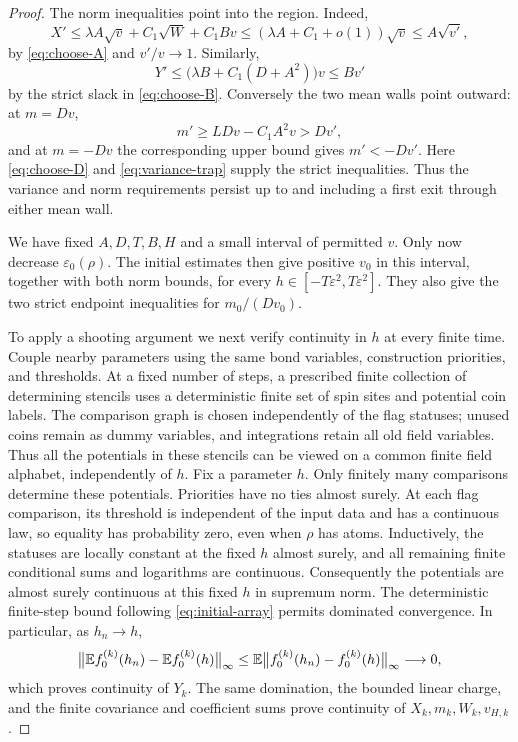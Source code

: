 \begin{proof}
The norm inequalities point into the region.  Indeed,
\[
 X'\le\lambda A\sqrt v+C_1\sqrt W+C_1Bv
     \le(\lambda A+C_1+o(1))\sqrt v
     \le A\sqrt{v'},
\]
by \eqref{eq:choose-A} and \(v'/v\to1\).  Similarly,
\[
 Y'\le\bigl(\lambda B+C_1(D+A^2)\bigr)v\le Bv'
\]
by the strict slack in \eqref{eq:choose-B}.  Conversely the two mean
walls point outward: at \(m=Dv\),
\[
 m'\ge LDv-C_1A^2v>Dv',
\]
and at \(m=-Dv\) the corresponding upper bound gives \(m'<-Dv'\).
Here \eqref{eq:choose-D} and \eqref{eq:variance-trap} supply the strict
inequalities.  Thus the variance and norm requirements persist up to
and including a first exit through either mean wall.

We have fixed \(A,D,T,B,H\) and a small interval of permitted \(v\).
Only now decrease \(\varepsilon_0(\rho)\).  The initial estimates then
give positive \(v_0\) in this interval, together with both norm bounds,
for every \(h\in[-T\varepsilon^2,T\varepsilon^2]\).  They also give
the two strict endpoint inequalities for \(m_0/(Dv_0)\).

To apply a shooting argument we next verify continuity in \(h\) at
every finite time.  Couple nearby parameters using the same bond
variables, construction priorities, and thresholds.  At a fixed number
of steps, a prescribed finite collection of determining stencils uses
a deterministic finite set of spin sites and potential coin labels.
The comparison graph is chosen independently of the flag statuses;
unused coins remain as dummy variables, and integrations retain all old
field variables.  Thus all the potentials in these stencils can be
viewed on a common finite field alphabet, independently of \(h\).
Fix a parameter \(h\).  Only finitely many comparisons determine these
potentials.
Priorities have no ties almost surely.  At each flag comparison, its
threshold is independent of the input data and has a continuous law,
so equality has probability zero, even when \(\rho\) has atoms.
Inductively, the statuses are locally constant at the fixed \(h\)
almost surely, and all remaining finite conditional sums and logarithms
are continuous.  Consequently the potentials are almost surely
continuous at this fixed \(h\) in supremum norm.  The deterministic
finite-step bound following \eqref{eq:initial-array} permits dominated
convergence.  In particular, as \(h_n\to h\),
\[
 \bigl\|\mathbb E f_0^{(k)}(h_n)-\mathbb E f_0^{(k)}(h)\bigr\|_\infty
 \le\mathbb E\bigl\|f_0^{(k)}(h_n)-f_0^{(k)}(h)\bigr\|_\infty
 \longrightarrow0,
\]
which proves continuity of \(Y_k\).  The same domination, the bounded
linear charge, and the finite covariance and coefficient sums prove
continuity of \(X_k,m_k,W_k,v_{H,k}\).


\end{proof}
